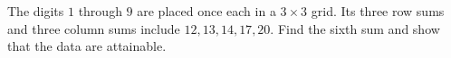 The digits $1$ through $9$ are placed once each in a $3\times3$ grid. Its three row sums and three column sums include $12,13,14,17,20$. Find the sixth sum and show that the data are attainable.
